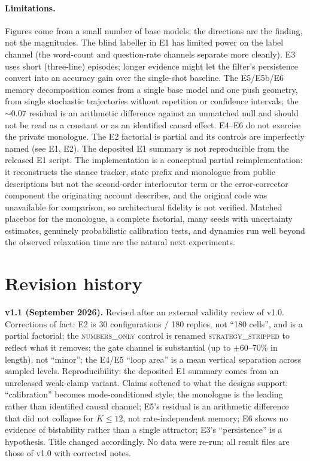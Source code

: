 \documentclass[11pt]{article}
\begin{document}
\paragraph{Limitations.} Figures come from a small number of base models; the
directions are the finding, not the magnitudes. The blind labeller in E1 has
limited power on the label channel (the word-count and question-rate channels
separate more cleanly). E3 uses short (three-line) episodes; longer evidence
might let the filter's persistence convert into an accuracy gain over the
single-shot baseline. The E5/E5b/E6 memory decomposition comes from a single
base model and one push geometry, from single stochastic trajectories without
repetition or confidence intervals; the $\sim$0.07 residual is an arithmetic
difference against an unmatched null and should not be read as a constant or as
an identified causal effect. E4--E6 do not exercise the private monologue. The
E2 factorial is partial and its controls are imperfectly named (see E1, E2).
The deposited E1 summary is not reproducible from the released E1 script. The
implementation is a conceptual partial reimplementation: it reconstructs the
stance tracker, state prefix and monologue from public descriptions but not the
second-order interlocutor term or the error-corrector component the originating
account describes, and the original code was unavailable for comparison, so
architectural fidelity is not verified. Matched placebos for the monologue, a
complete factorial, many seeds with uncertainty estimates, genuinely
probabilistic calibration tests, and dynamics run well beyond the observed
relaxation time are the natural next experiments.

\section*{Revision history}
\textbf{v1.1 (September 2026).} Revised after an external validity review of
v1.0. Corrections of fact: E2 is 30 configurations / 180 replies, not ``180
cells'', and is a partial factorial; the \textsc{numbers\_only} control is
renamed \textsc{strategy\_stripped} to reflect what it removes; the gate channel
is substantial (up to $\pm$60--70\% in length), not ``minor''; the E4/E5
``loop area'' is a mean vertical separation across sampled levels. Reproducibility:
the deposited E1 summary comes from an unreleased weak-clamp variant. Claims
softened to what the designs support: ``calibration'' becomes mode-conditioned
style; the monologue is the leading rather than identified causal channel;
E5's residual is an arithmetic difference that did not collapse for $K\le12$,
not rate-independent memory; E6 shows no evidence of bistability rather than a
single attractor; E3's ``persistence'' is a hypothesis. Title changed
accordingly. No data were re-run; all result files are those of v1.0 with
corrected notes.
\end{document}
